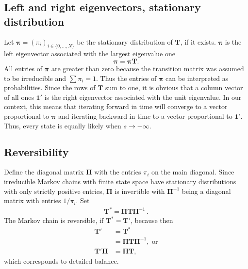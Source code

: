 \documentclass[preprint]{elsarticle}
\newcommand{\bs}[1]{\ensuremath{\boldsymbol{#1}}}
\newcommand\given{{\,|\,}}
\newcommand\ie{{\it i.e.,}}
\newcommand\x[1]{\ensuremath{X_{#1}}}
\newcommand\oneC{\ensuremath{\mathbf{1}'}}
\newcommand\oneR{\ensuremath{\mathbf{1}}}
\begin{document}
\subsection{Left and right eigenvectors, stationary distribution}

Let $\bs{\pi} = (\pi_i)_{i \in \{0,\ldots,N\}}$ be the stationary distribution of $\mathbf{T}$, if it exists. $\bs{\pi}$ is the left eigenvector associated with the largest eigenvalue one~\citep[][p. 87]{Ewen04}
\begin{equation}\label{eq:stationary}
\bs{\pi}=\bs{\pi}\mathbf{T}.
\end{equation}
All entries of $\bs{\pi}$ are greater than zero because the transition matrix was assumed to be irreducible and $\sum \pi_i = 1$. Thus the entries of $\bs{\pi}$ can be interpreted as probabilities. Since the rows of $\mathbf{T}$ sum to one, it is obvious that a column vector of all ones $\oneC$ is the right eigenvector associated with the unit eigenvalue. In our context, this means that iterating forward in time will converge to a vector proportional to $\bs{\pi}$ and iterating backward in time to a vector proportional to $\oneC$. Thus, every state is equally likely when  $s\to-\infty$. %

\subsection{Reversibility}

Define the diagonal matrix $\mathbf{\Pi}$ with the entries $\pi_i$ on the main diagonal. Since irreducible Markov chains with finite state space have stationary distributions with only strictly positive entries, $\mathbf{\Pi}$ is invertible with $\mathbf{\Pi}^{-1}$ being a diagonal matrix with entries $1/\pi_i$.  Set
\begin{equation}\label{eq:reverse_transition}
\begin{split}
\mathbf{T}^{*}=\mathbf{\Pi}\mathbf{T}\mathbf{\Pi}^{-1}\,.
\end{split}
\end{equation}
The Markov chain is reversible, if $\mathbf{T}^{*}=\mathbf{T}'$, because then
\begin{equation}\label{eq:detailed_balance}
\begin{split}
  \mathbf{T}' &= \mathbf{T}^{*} \\
             &= \mathbf{\Pi}\mathbf{T}\mathbf{\Pi}^{-1}, \text{ or} \\
  \mathbf{T}'\mathbf{\Pi} &= \mathbf{\Pi T},
\end{split}
\end{equation}
which corresponds to detailed balance.
\end{document}
